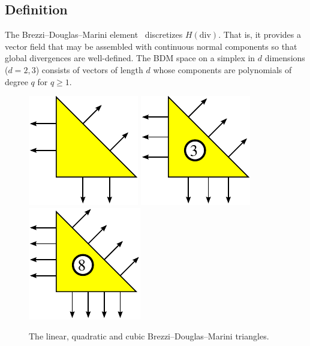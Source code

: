 \subsection{Definition}

The Brezzi--Douglas--Marini element~\cite{Brezzi1974aDouglasEtAl1985}
discretizes \( H(\mathrm{div}) \). That is, it provides a vector field
that may be assembled with continuous normal components so that global
divergences are well-defined.  The BDM space on a simplex in \( d \)
dimensions (\( d=2,3 \)) consists of vectors of length \( d \) whose
components are polynomials of degree \( q \) for
\( q \geq 1 \).

\begin{figure}[h]
  \begin{center}
    \includegraphics[width=\smallfig]{chapters/kirby-6/pdf/BDM1.pdf}
    \includegraphics[width=\smallfig]{chapters/kirby-6/pdf/BDM2.pdf}
    \includegraphics[width=\smallfig]{chapters/kirby-6/pdf/BDM3.pdf}
    \caption{The linear, quadratic and cubic Brezzi--Douglas--Marini
      triangles.}
  \end{center}
\end{figure}

